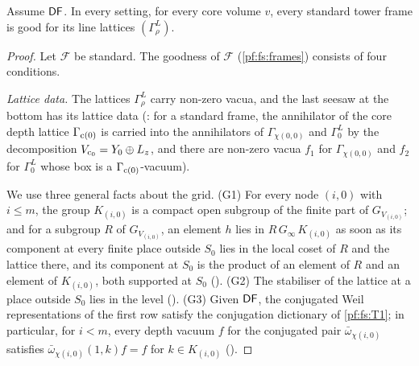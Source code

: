 \begin{proposition}\label{pf:fs:stdGood}
Assume $\mathsf{DF}$. In every setting, for every core volume $v$, every standard tower frame is good for its line lattices
$(\Gamma^L_\rho)$.
\end{proposition}

\begin{proof}
Let $\mathcal F$ be standard. The goodness of $\mathcal F$ (\cref{pf:fs:frames}) consists of four conditions.

\emph{Lattice data.} The lattices $\Gamma^L_\rho$ carry non-zero vacua, and the last seesaw at the bottom has its lattice data
(: for a standard frame, the annihilator of the core depth lattice
$\Gamma_{\mathrm{c}(0)}$ is carried into the annihilators of $\Gamma_{\chi(0,0)}$ and $\Gamma^L_0$ by the decomposition $V_{\mathrm{c}_0}=Y_0\oplus L_z$, and
there are non-zero vacua $f_1$ for $\Gamma_{\chi(0,0)}$ and $f_2$ for $\Gamma^L_0$ whose box is a $\Gamma_{\mathrm{c}(0)}$-vacuum).

We use three general facts about the grid. (G1) For every node $(i,0)$ with $i\le m$, the group $K_{(i,0)}$ is a compact open subgroup of
the finite part of $G_{V_{(i,0)}}$; and for a subgroup $R$ of $G_{V_{(i,0)}}$, an element $h$ lies in $R\,G_\infty\,K_{(i,0)}$ as soon as its
component at every finite place outside $S_0$ lies in the local coset of $R$ and the lattice there, and its component at $S_0$ is the
product of an element of $R$ and an element of $K_{(i,0)}$, both supported at $S_0$
(). (G2) The stabiliser of the lattice at a
place outside $S_0$ lies in the level (). (G3) Given
$\mathsf{DF}$, the conjugated Weil representations of the first row satisfy the conjugation dictionary of \ref{pf:fs:T1}; in particular,
for $i<m$, every depth vacuum $f$ for the conjugated pair $\bar\omega_{\chi(i,0)}$ satisfies $\bar\omega_{\chi(i,0)}(1,k)f=f$ for
$k\in K_{(i,0)}$ ().


\end{proof}
